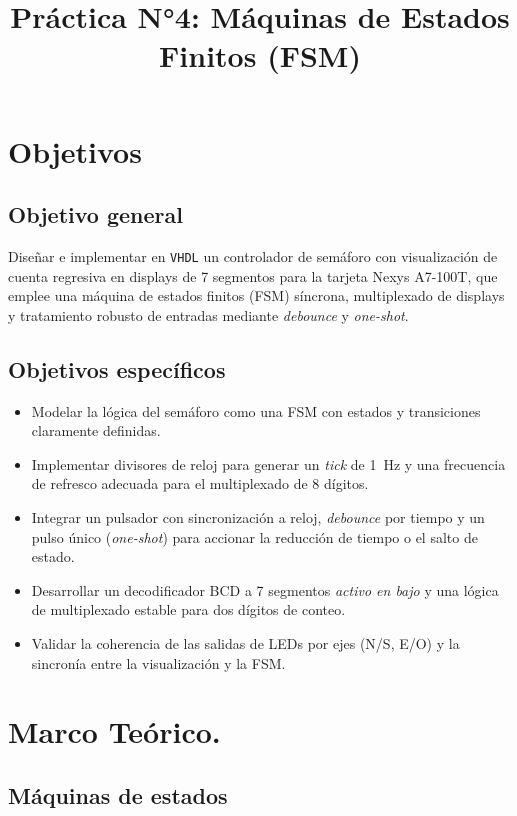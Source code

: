 \documentclass[a4paper,12pt]{article}
\title{Práctica N°4: Máquinas de Estados Finitos (FSM)}
\date{}
\begin{document}
\maketitle
\tableofcontents
\newpage

\section{Objetivos}

\subsection{Objetivo general}
Diseñar e implementar en \texttt{VHDL} un controlador de semáforo con visualización de cuenta regresiva en displays de 7 segmentos para la tarjeta Nexys A7-100T, que emplee una máquina de estados finitos (FSM) síncrona, multiplexado de displays y tratamiento robusto de entradas mediante \emph{debounce} y \emph{one-shot}.

\subsection{Objetivos específicos}
\begin{itemize}
    \item Modelar la lógica del semáforo como una FSM con estados y transiciones claramente definidas.
    \item Implementar divisores de reloj para generar un \emph{tick} de 1~Hz y una frecuencia de refresco adecuada para el multiplexado de 8 dígitos.
    \item Integrar un pulsador con sincronización a reloj, \emph{debounce} por tiempo y un pulso único (\emph{one-shot}) para accionar la reducción de tiempo o el salto de estado.
    \item Desarrollar un decodificador BCD a 7 segmentos \emph{activo en bajo} y una lógica de multiplexado estable para dos dígitos de conteo.
    \item Validar la coherencia de las salidas de LEDs por ejes (N/S, E/O) y la sincronía entre la visualización y la FSM.
\end{itemize}

\section{Marco Teórico.}

\subsection{Máquinas de estados}
\end{document}
